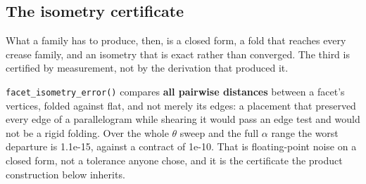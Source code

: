 \documentclass[
  british,
  a4paper,
]{book}
\newenvironment{Shaded}{\begin{snugshade}}{\end{snugshade}}
\newcommand{\AttributeTok}[1]{\textcolor[rgb]{0.13,0.29,0.53}{#1}}
\newcommand{\ControlFlowTok}[1]{\textcolor[rgb]{0.13,0.29,0.53}{\textbf{#1}}}
\newcommand{\DataTypeTok}[1]{\textcolor[rgb]{0.13,0.29,0.53}{#1}}
\newcommand{\DecValTok}[1]{\textcolor[rgb]{0.00,0.00,0.81}{#1}}
\newcommand{\FloatTok}[1]{\textcolor[rgb]{0.00,0.00,0.81}{#1}}
\newcommand{\FunctionTok}[1]{\textcolor[rgb]{0.13,0.29,0.53}{\textbf{#1}}}
\newcommand{\NormalTok}[1]{#1}
\newcommand{\OtherTok}[1]{\textcolor[rgb]{0.56,0.35,0.01}{#1}}
\newcommand{\SpecialCharTok}[1]{\textcolor[rgb]{0.81,0.36,0.00}{\textbf{#1}}}
\begin{document}
\subsection{The isometry certificate}\label{the-isometry-certificate}

What a family has to produce, then, is a closed form, a fold that reaches every
crease family, and an isometry that is exact rather than converged. The third is
certified by measurement, not by the derivation that produced it.

\begin{Shaded}
\end{Shaded}

\texttt{facet\_isometry\_error()} compares \textbf{all pairwise distances} between a facet's
vertices, folded against flat, and not merely its edges: a placement that
preserved every edge of a parallelogram while shearing it would pass an edge
test and would not be a rigid folding. Over the whole \(\theta\) sweep and the
full \(\alpha\) range the worst departure is
1.1e-15, against a contract of
1e-10. That is floating-point noise on a
closed form, not a tolerance anyone chose, and it is the certificate the product
construction below inherits.
\end{document}
